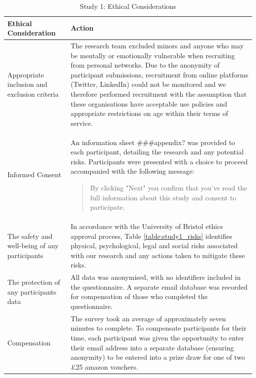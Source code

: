 \documentclass[manuscript,screen,review]{acmart}
\begin{document}
\begin{table}
\begin{center}
\begin{tabular}{ | p{3cm} | p{8cm} |}
\hline
 Ethical Consideration & Action \\
 \hline
 \hline
 Appropriate inclusion and exclusion criteria & The research team excluded minors and anyone who may be mentally or emotionally vulnerable when recruiting from personal networks. Due to the anonymity of participant submissions, recruitment from online platforms (Twitter, LinkedIn) could not be monitored and we therefore performed recruitment with the assumption that these organisations have acceptable use policies and appropriate restrictions on age within their terms of service.\\
 \hline
Informed Consent & An information sheet ###appendix? was provided to each participant, detailing the research and any potential risks. Participants were presented with a choice to proceed accompanied with the following message:

\begin{quote}
    By clicking "Next" you confirm that you've read the full information about this study and consent to participate.
\end{quote} \\
 \hline
 The safety and well-being of any participants & In accordance with the University of Bristol ethics approval process, Table \ref{table:study1_risks} identifies physical, psychological, legal and social risks associated with our research and any actions taken to mitigate these risks. \\
\hline
The protection of any participants data & All data was anonymised, with no identifiers included in the questionnaire. A separate email database was recorded for compensation of those who completed the questionnaire. \\
\hline
Compensation & The survey took an average of approximately seven minutes to complete. To compensate participants for their time, each participant was given the opportunity to enter their email address into a separate database (ensuring anonymity) to be entered into a prize draw for one of two £25 amazon vouchers. \\
 \hline
\end{tabular}
\caption{Study 1: Ethical Considerations}
\label{table:study1_ethical_considerations}
\end{center}
\end{table}
\end{document}
